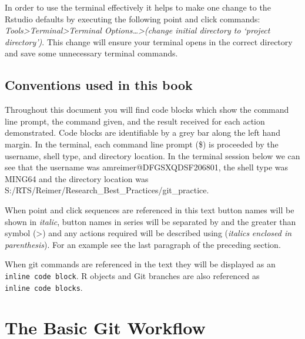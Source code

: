 \documentclass[
  letterpaper,
  DIV=11,
  numbers=noendperiod]{scrreprt}
\newenvironment{Shaded}{\begin{snugshade}}{\end{snugshade}}
\newcommand{\NormalTok}[1]{\textcolor[rgb]{0.00,0.23,0.31}{#1}}
\begin{document}
In order to use the terminal effectively it helps to make one change to
the Rstudio defaults by executing the following point and click
commands: \emph{Tools\textgreater Terminal\textgreater Terminal
Options\ldots\textgreater(change initial directory to `project
directory')}. This change will ensure your terminal opens in the correct
directory and save some unnecessary terminal commands.

\hypertarget{conventions-used-in-this-book}{%
\section{Conventions used in this
book}\label{conventions-used-in-this-book}}

Throughout this document you will find code blocks which show the
command line prompt, the command given, and the result received for each
action demonstrated. Code blocks are identifiable by a grey bar along
the left hand margin. In the terminal, each command line prompt (\$) is
proceeded by the username, shell type, and directory location. In the
terminal session below we can see that the username was
amreimer@DFGSXQDSF206801, the shell type was MING64 and the directory
location was S:/RTS/Reimer/Research\_Best\_Practices/git\_practice.

\begin{Shaded}
\end{Shaded}

When point and click sequences are referenced in this text button names
will be shown in \emph{italic}, button names in series will be separated
by and the greater than symbol (\textgreater) and any actions required
will be described using (\emph{italics} \emph{enclosed in parenthesis}).
For an example see the last paragraph of the preceding section.

When git commands are referenced in the text they will be displayed as
an \texttt{inline\ code\ block}. R objects and Git branches are also
referenced as \texttt{inline\ code\ blocks}.


\hypertarget{the-basic-git-workflow}{%
\chapter{The Basic Git Workflow}\label{the-basic-git-workflow}}
\end{document}
